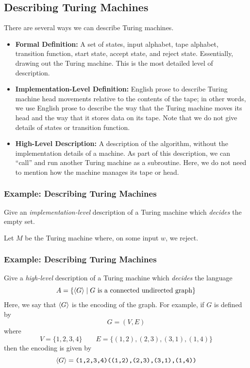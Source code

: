\documentclass[letterpaper]{article}
\begin{document}
\subsection{Describing Turing Machines}
There are several ways we can describe Turing machines. 
\begin{itemize}
    \item \textbf{Formal Definition:} A set of states, input alphabet, tape alphabet, transition function, start state, accept state, and reject state. Essentially, drawing out the Turing machine. This is the most detailed level of description. 
    \item \textbf{Implementation-Level Definition:} English prose to describe Turing machine head movements relative to the contents of the tape; in other words, we use English prose to describe the way that the Turing machine moves its head and the way that it stores data on its tape. Note that we do not give details of states or transition function.
    \item \textbf{High-Level Description:} A description of the algorithm, without the implementation details of a machine. As part of this description, we can ``call'' and run another Turing machine as a subroutine. Here, we do not need to mention how the machine manages its tape or head.
\end{itemize}

\subsubsection{Example: Describing Turing Machines}
Give an \emph{implementation-level} description of a Turing machine which \emph{decides} the empty set. 

\begin{mdframed}[]
    Let $M$ be the Turing machine where, on some input $w$, we reject.
\end{mdframed}

\subsubsection{Example: Describing Turing Machines}
Give a \emph{high-level} description of a Turing machine which \emph{decides} the language 
\[A = \{\langle G \rangle \mid G \text{ is a connected undirected graph}\}\]
Here, we say that $\langle G \rangle$ is the encoding of the graph. For example, if $G$ is defined by 
\[G = (V, E)\]
where 
\[V = \{1, 2, 3, 4\} \qquad E = \{(1, 2), (2, 3), (3, 1), (1, 4)\}\]
then the encoding is given by 
\[\langle G \rangle = \texttt{(1,2,3,4)((1,2),(2,3),(3,1),(1,4))}\]
\end{document}
